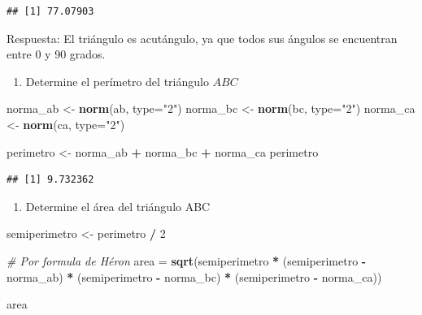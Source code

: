 \documentclass[]{article}
\newenvironment{Shaded}{\begin{snugshade}}{\end{snugshade}}
\newcommand{\CommentTok}[1]{\textcolor[rgb]{0.56,0.35,0.01}{\textit{#1}}}
\newcommand{\DataTypeTok}[1]{\textcolor[rgb]{0.13,0.29,0.53}{#1}}
\newcommand{\DecValTok}[1]{\textcolor[rgb]{0.00,0.00,0.81}{#1}}
\newcommand{\KeywordTok}[1]{\textcolor[rgb]{0.13,0.29,0.53}{\textbf{#1}}}
\newcommand{\NormalTok}[1]{#1}
\newcommand{\OperatorTok}[1]{\textcolor[rgb]{0.81,0.36,0.00}{\textbf{#1}}}
\newcommand{\StringTok}[1]{\textcolor[rgb]{0.31,0.60,0.02}{#1}}
\providecommand{\tightlist}{%
  \setlength{\itemsep}{0pt}\setlength{\parskip}{0pt}}
\begin{document}
\begin{verbatim}
## [1] 77.07903
\end{verbatim}

Respuesta: El triángulo es acutángulo, ya que todos sus ángulos se
encuentran entre 0 y 90 grados.

\begin{enumerate}
\def\labelenumi{\alph{enumi}.}
\setcounter{enumi}{1}
\tightlist
\item
  Determine el perímetro del triángulo \(ABC\)
\end{enumerate}

\begin{Shaded}
\begin{Highlighting}[]
\NormalTok{norma_ab <-}\StringTok{ }\KeywordTok{norm}\NormalTok{(ab, }\DataTypeTok{type=}\StringTok{"2"}\NormalTok{)}
\NormalTok{norma_bc <-}\StringTok{ }\KeywordTok{norm}\NormalTok{(bc, }\DataTypeTok{type=}\StringTok{"2"}\NormalTok{)}
\NormalTok{norma_ca <-}\StringTok{ }\KeywordTok{norm}\NormalTok{(ca, }\DataTypeTok{type=}\StringTok{"2"}\NormalTok{)}

\NormalTok{perimetro <-}\StringTok{ }\NormalTok{norma_ab }\OperatorTok{+}\StringTok{ }\NormalTok{norma_bc }\OperatorTok{+}\StringTok{ }\NormalTok{norma_ca}
\NormalTok{perimetro}
\end{Highlighting}
\end{Shaded}

\begin{verbatim}
## [1] 9.732362
\end{verbatim}

\begin{enumerate}
\def\labelenumi{\alph{enumi}.}
\setcounter{enumi}{2}
\tightlist
\item
  Determine el área del triángulo ABC
\end{enumerate}

\begin{Shaded}
\begin{Highlighting}[]
\NormalTok{semiperimetro <-}\StringTok{ }\NormalTok{perimetro }\OperatorTok{/}\StringTok{ }\DecValTok{2}

\CommentTok{# Por formula de Héron}
\NormalTok{area =}\StringTok{ }\KeywordTok{sqrt}\NormalTok{(semiperimetro }\OperatorTok{*}\StringTok{ }\NormalTok{(semiperimetro }\OperatorTok{-}\StringTok{ }\NormalTok{norma_ab) }\OperatorTok{*}\StringTok{ }\NormalTok{(semiperimetro }\OperatorTok{-}\StringTok{ }\NormalTok{norma_bc) }\OperatorTok{*}\StringTok{ }\NormalTok{(semiperimetro }\OperatorTok{-}\StringTok{ }\NormalTok{norma_ca))}

\NormalTok{area}
\end{Highlighting}
\end{Shaded}
\end{document}
